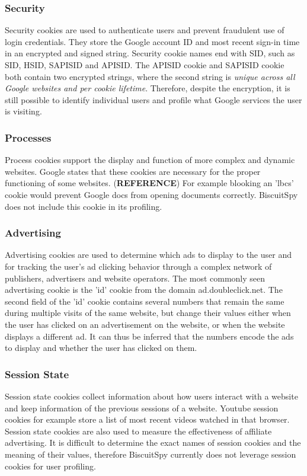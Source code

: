 \subsubsection{Security}
Security cookies are used to authenticate users and prevent fraudulent use of login credentials. They store the Google account ID and most recent sign-in time in an encrypted and signed string. Security cookie names end with SID, such as SID, HSID, SAPISID and APISID. The APISID cookie and SAPISID cookie both contain two encrypted strings, where the second string is \emph{unique across all Google websites and per cookie lifetime}. Therefore, despite the encryption, it is still possible to identify individual users and profile what Google services the user is visiting.

\subsubsection{Processes}
Process cookies support the display and function of more complex and dynamic websites. Google states that these cookies are necessary for the proper functioning of some websites. (\textbf{REFERENCE}) For example blooking an 'lbcs' cookie would prevent Google docs from opening documents correctly. BiscuitSpy does not include this cookie in its profiling.

\subsubsection{Advertising}
Advertising cookies are used to determine which ads to display to the user and for tracking the user's ad clicking behavior through a complex network of publishers, advertisers and website operators. The most commonly seen advertising cookie is the 'id' cookie from the domain ad.doubleclick.net. The second field of the 'id' cookie contains several numbers that remain the same during multiple visits of the same website, but change their values either when the user has clicked on an advertisement on the website, or when the website displays a different ad. It can thus be inferred that the numbers encode the ads to display and whether the user has clicked on them.

\subsubsection{Session State}
Session state cookies collect information about how users interact with a website and keep information of the previous sessions of a website. Youtube session cookies for example store a list of most recent videos watched in that browser. Session state cookies are also used to measure the effectiveness of affiliate advertising. It is difficult to determine the exact names of session cookies and the meaning of their values, therefore BiscuitSpy currently does not leverage session cookies for user profiling.

